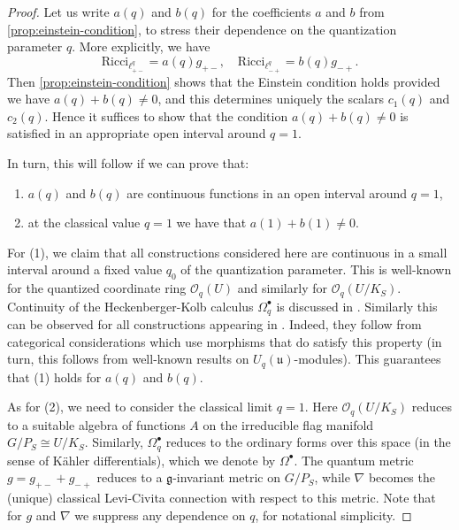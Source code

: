 \documentclass[a4paper,12pt,reqno,english]{amsart}
\numberwithin{equation}{section}
\numberwithin{figure}{section}
\theoremstyle{plain}
\theoremstyle{plain}
\theoremstyle{plain}
\theoremstyle{plain}
\theoremstyle{plain}
\theoremstyle{definition}
\theoremstyle{definition}
\theoremstyle{definition}
\theoremstyle{remark}
\theoremstyle{definition}
\newcommand{\lieg}{\mathfrak{g}}
\newcommand{\Uqu}{U_q(\mathfrak{u})}
\newcommand{\OqU}{\mathcal{O}_q(U)}
\newcommand{\Oqflag}{\mathcal{O}_q(U / K_S)}
\newcommand{\Ricci}{\mathrm{Ricci}}
\newcommand{\liftqpm}{\ell^q_{+ -}}
\newcommand{\liftqmp}{\ell^q_{- +}}
\newcommand{\diffcalc}{\Omega_q}
\begin{document}
\begin{proof}
Let us write $a(q)$ and $b(q)$ for the coefficients $a$ and $b$ from \cref{prop:einstein-condition}, to stress their dependence on the quantization parameter $q$. More explicitly, we have
\begin{equation}
\label{eq:ricci-q}
\Ricci_{\liftqpm} = a(q) g_{+ -}, \quad
\Ricci_{\liftqmp} = b(q) g_{- +}.
\end{equation}
Then \cref{prop:einstein-condition} shows that the Einstein condition holds provided we have $a(q) + b(q) \neq 0$, and this determines uniquely the scalars $c_1(q)$ and $c_2(q)$.
Hence it suffices to show that the condition $a(q) + b(q) \neq 0$ is satisfied in an appropriate open interval around $q = 1$.

In turn, this will follow if we can prove that:
\begin{enumerate}
\item $a(q)$ and $b(q)$ are continuous functions in an open interval around $q = 1$,
\item at the classical value $q = 1$ we have that $a(1) + b(1) \neq 0$.
\end{enumerate}

For (1), we claim that all constructions considered here are continuous in a small interval around a fixed value $q_0$ of the quantization parameter.
This is well-known for the quantized coordinate ring $\OqU$ and similarly for $\Oqflag$. Continuity of the Heckenberger-Kolb calculus $\diffcalc^\bullet$ is discussed in \cite[Lemma 5.7]{kahler}.
Similarly this can be observed for all constructions appearing in \cite{levicivita-irreducible}. Indeed, they follow from categorical considerations which use morphisms that do satisfy this property (in turn, this follows from well-known results on $\Uqu$-modules).
This guarantees that (1) holds for $a(q)$ and $b(q)$.

As for (2), we need to consider the classical limit $q = 1$.
Here $\Oqflag$ reduces to a suitable algebra of functions $A$ on the irreducible flag manifold $G / P_S \cong U / K_S$.
Similarly, $\diffcalc^\bullet$ reduces to the ordinary forms over this space (in the sense of Kähler differentials), which we denote by $\Omega^\bullet$.
The quantum metric $g = g_{+ -} + g_{- +}$ reduces to a $\lieg$-invariant metric on $G / P_S$, while $\nabla$ becomes the (unique) classical Levi-Civita connection with respect to this metric.
Note that for $g$ and $\nabla$ we suppress any dependence on $q$, for notational simplicity.


\end{proof}
\end{document}
